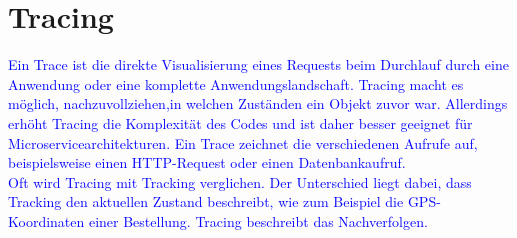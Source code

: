 \section{Tracing}\label{sec:tracing}
\textcolor{blue}{
Ein Trace ist die direkte Visualisierung eines Requests beim Durchlauf durch eine Anwendung oder eine komplette Anwendungslandschaft.
Tracing macht es möglich, nachzuvollziehen,in welchen Zuständen ein Objekt zuvor war.
Allerdings erhöht Tracing die Komplexität des Codes und ist daher besser geeignet für Microservicearchitekturen.
Ein Trace zeichnet die verschiedenen Aufrufe auf, beispielsweise einen HTTP-Request oder einen Datenbankaufruf.
\\
Oft wird Tracing mit Tracking verglichen.
Der Unterschied liegt dabei, dass Tracking den aktuellen Zustand beschreibt, wie zum Beispiel die GPS-Koordinaten einer Bestellung.
Tracing beschreibt das Nachverfolgen.
}\autocite{adesso, monstarlab}


